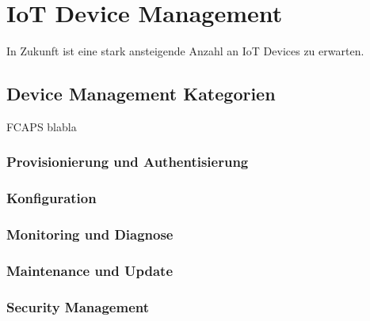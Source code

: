 \chapter{IoT Device Management}
In Zukunft ist eine stark ansteigende Anzahl an IoT Devices zu erwarten. 
\section{Device Management Kategorien}
FCAPS blabla
\subsection{Provisionierung und Authentisierung}
\subsection{Konfiguration}
\subsection{Monitoring und Diagnose}
\subsection{Maintenance und Update}
\subsection{Security Management}

\section{}




















